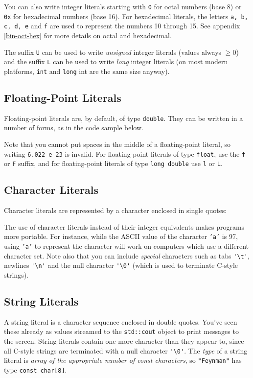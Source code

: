 \documentclass[a4paper]{scrartcl}
\begin{document}


You can also write integer literals starting with \texttt{0} for octal numbers (base 8) or \texttt{0x} for hexadecimal numbers (base 16). For hexadecimal literals, the letters \texttt{a, b, c, d, e} and \texttt{f} are used to represent the numbers 10 through 15. See appendix \ref{bin-oct-hex} for more details on octal and hexadecimal.



The suffix \texttt{U} can be used to write \emph{unsigned} integer literals (values always $\ge 0$) and the suffix \texttt{L} can be used to write \emph{long} integer literals (on most modern platforms, \texttt{int} and \texttt{long} int are the same size anyway).

\subsection{Floating-Point Literals}
Floating-point literals are, by default, of type \texttt{double}. They can be written in a number of forms, as in the code sample below.



Note that you cannot put spaces in the middle of a floating-point literal, so writing \texttt{6.022 e 23} is invalid. For floating-point literals of type \texttt{float}, use the \texttt{f} or \texttt{F} suffix, and for floating-point literals of type \texttt{long double} use \texttt{l} or \texttt{L}.

\subsection{Character Literals}
Character literals are represented by a character enclosed in single quotes:



The use of character literals instead of their integer equivalents makes programs more portable. For instance, while the ASCII value of the character \texttt{'a'} is 97, using \texttt{'a'} to represent the character will work on computers which use a different character set. Note also that you can include \emph{special} characters such as tabs \verb|'\t'|, newlines \verb|'\n'| and the null character \verb|'\0'| (which is used to terminate C-style strings).

\subsection{String Literals}
A string literal is a character sequence enclosed in double quotes. You've seen these already as values streamed to the \texttt{std::cout} object to print messages to the screen. String literals contain one more character than they appear to, since all C-style strings are terminated with a null character \verb|'\0'|. The \emph{type} of a string literal is \emph{array of the appropriate number of \emph{const} characters}, so \texttt{"Feynman"} has type \texttt{const char[8]}.
\end{document}
